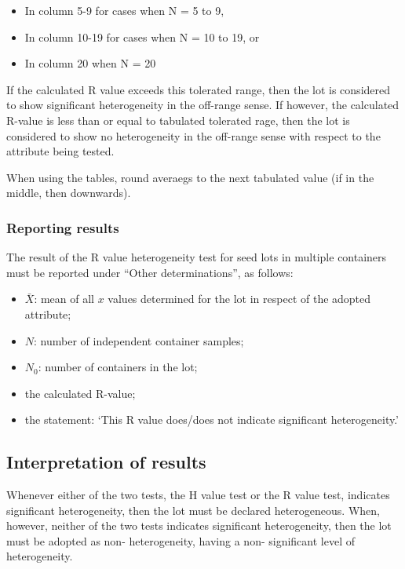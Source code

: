 \documentclass[
]{book}
\providecommand{\tightlist}{%
  \setlength{\itemsep}{0pt}\setlength{\parskip}{0pt}}
\begin{document}
\begin{itemize}
\tightlist
\item
  In column 5-9 for cases when N = 5 to 9,
\item
  In column 10-19 for cases when N = 10 to 19, or
\item
  In column 20 when N = 20
\end{itemize}

If the calculated R value exceeds this tolerated range, then the lot is considered to show significant heterogeneity in the off-range sense. If however, the calculated R-value is less than or equal to tabulated tolerated rage, then the lot is considered to show no heterogeneity in the off-range sense with respect to the attribute being tested.

When using the tables, round averaegs to the next tabulated value (if in the middle, then downwards).

\hypertarget{reporting-results-1}{%
\subsubsection{Reporting results}\label{reporting-results-1}}

The result of the R value heterogeneity test for seed lots in multiple containers must be reported under ``Other determinations'', as follows:

\begin{itemize}
\tightlist
\item
  \(\bar{X}\): mean of all \(x\) values determined for the lot in respect of the adopted attribute;
\item
  \(N\): number of independent container samples;
\item
  \(N_0\): number of containers in the lot;
\item
  the calculated R-value;
\item
  the statement: `This R value does/does not indicate significant heterogeneity.'
\end{itemize}

\hypertarget{interpretation-of-results}{%
\subsection{Interpretation of results}\label{interpretation-of-results}}

Whenever either of the two tests, the H value test or the R value test, indicates significant heterogeneity, then the lot must be declared heterogeneous. When, however, neither of the two tests indicates significant heterogeneity, then the lot must be adopted as non- heterogeneity, having a non- significant level of heterogeneity.
\end{document}

